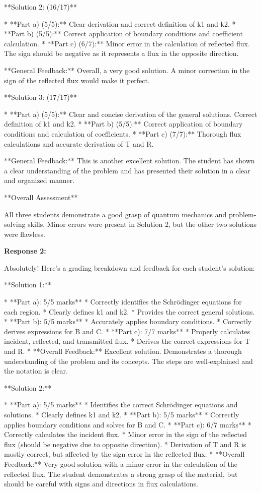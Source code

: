 \documentclass[a4paper,11pt]{article}
\begin{document}
**Solution 2: (16/17)**

*   **Part a) (5/5):** Clear derivation and correct definition of k1 and k2.
*   **Part b) (5/5):** Correct application of boundary conditions and coefficient calculation.
*   **Part c) (6/7):** Minor error in the calculation of reflected flux. The sign should be negative as it represents a flux in the opposite direction.

**General Feedback:** Overall, a very good solution.  A minor correction in the sign of the reflected flux would make it perfect.

**Solution 3: (17/17)**

*   **Part a) (5/5):**  Clear and concise derivation of the general solutions. Correct definition of k1 and k2.
*   **Part b) (5/5):**  Correct application of boundary conditions and calculation of coefficients.
*   **Part c) (7/7):** Thorough flux calculations and accurate derivation of T and R.

**General Feedback:** This is another excellent solution. The student has shown a clear understanding of the problem and has presented their solution in a clear and organized manner.

**Overall Assessment**

All three students demonstrate a good grasp of quantum mechanics and problem-solving skills. Minor errors were present in Solution 2, but the other two solutions were flawless. 

\bigskip    
\textbf{Response 2:}

Absolutely! Here's a grading breakdown and feedback for each student's solution:

**Solution 1:**

*   **Part a): 5/5 marks**
    *   Correctly identifies the Schrödinger equations for each region.
    *   Clearly defines k1 and k2.
    *   Provides the correct general solutions.
*   **Part b): 5/5 marks**
    *   Accurately applies boundary conditions.
    *   Correctly derives expressions for B and C.
*   **Part c): 7/7 marks**
    *   Properly calculates incident, reflected, and transmitted flux.
    *   Derives the correct expressions for T and R.
*   **Overall Feedback:**  Excellent solution. Demonstrates a thorough understanding of the problem and its concepts. The steps are well-explained and the notation is clear.

**Solution 2:**

*   **Part a): 5/5 marks**
    *   Identifies the correct Schrödinger equations and solutions.
    *   Clearly defines k1 and k2.
*   **Part b): 5/5 marks**
    *   Correctly applies boundary conditions and solves for B and C.
*   **Part c): 6/7 marks**
    *   Correctly calculates the incident flux.
    *   Minor error in the sign of the reflected flux (should be negative due to opposite direction).
    *   Derivation of T and R is mostly correct, but affected by the sign error in the reflected flux.
*   **Overall Feedback:** Very good solution with a minor error in the calculation of the reflected flux. The student demonstrates a strong grasp of the material, but should be careful with signs and directions in flux calculations.
\end{document}
